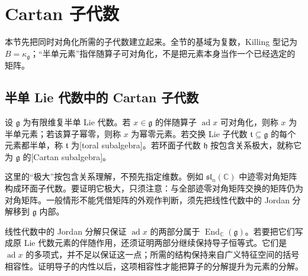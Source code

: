 
\section{Cartan 子代数}
\label{b5:sec:1601}

本节先把同时对角化所需的子代数建立起来。全节的基域为复数，Killing 型记为 \(B=\kappa_{\mathfrak g}\)；“半单元素”指伴随算子可对角化，不是把元素本身当作一个已经选定的矩阵。


%
%

\subsection{半单 Lie 代数中的 Cartan 子代数}
\label{b5:subsec:1601:01}

\begin{definition}\label{b5:def:toral-cartan}
	设 \(\mathfrak g\) 为有限维复半单 Lie 代数。若 \(x\in\mathfrak g\) 的伴随算子 \(\operatorname{ad}x\) 可对角化，则称 \(x\) 为半单元素；若该算子幂零，则称 \(x\) 为幂零元素。若交换 Lie 子代数 \(\mathfrak t\subseteq\mathfrak g\) 的每个元素都半单，称 \(\mathfrak t\) 为[toral subalgebra]。若环面子代数 \(\mathfrak h\) 按包含关系极大，就称它为 \(\mathfrak g\) 的[Cartan subalgebra]。
\end{definition}

这里的“极大”按包含关系理解，不预先指定维数。例如 \(\mathfrak{sl}_n(\mathbb C)\) 中迹零对角矩阵构成环面子代数。要证明它极大，只须注意：与全部迹零对角矩阵交换的矩阵仍为对角矩阵。一般情形不能凭借矩阵的外观作判断，须先把线性代数中的 Jordan 分解移到 \(\mathfrak g\) 内部。

\ProseParagraphBreak

线性代数中的 Jordan 分解只保证 \(\operatorname{ad}x\) 的两部分属于 \(\operatorname{End}_{\mathbb C}(\mathfrak g)\)。若要把它们写成原 Lie 代数元素的伴随作用，还须证明两部分继续保持导子恒等式。它们是 \(\operatorname{ad}x\) 的多项式，并不足以保证这一点；所需的结构保持来自广义特征空间的括号相容性。证明导子的内性以后，这项相容性才能把算子的分解提升为元素的分解。

